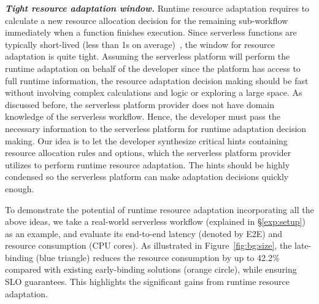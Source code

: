 \textbf{\textit{Tight resource adaptation window.}}
Runtime resource adaptation requires to calculate a new resource allocation decision for the remaining sub-workflow immediately when a function finishes execution. Since serverless functions are typically short-lived (less than 1s on average)~\cite{atc18-peek-bench,socc22-owl,atc20-serverless-in-the-wild,socc23-huawei-cloud}, the window for resource adaptation is quite tight. Assuming the serverless platform will perform the runtime adaptation on behalf of the developer since the platform has access to full runtime information, the resource adaptation decision making should be fast without involving complex calculations and logic or exploring a large space. As discussed before, the serverless platform provider does not have domain knowledge of the serverless workflow. Hence, the developer must pass the necessary information to the serverless platform for runtime adaptation decision making. Our idea is to let the developer synthesize critical hints containing resource allocation rules and options, which the serverless platform provider utilizes to perform runtime resource adaptation. The hints should be highly condensed so the serverless platform can make adaptation decisions quickly enough. 




To demonstrate the potential of runtime resource adaptation incorporating all the above ideas, we take a real-world serverless workflow (explained in \S\ref{exp:setup}) as an example, and evaluate its end-to-end latency (denoted by E2E) and resource consumption (CPU cores).
As illustrated in Figure~\ref{fig:bg:size}, the late-binding (blue triangle) reduces the resource consumption by up to 42.2\% compared with existing early-binding solutions (orange circle), while ensuring SLO guarantees. This highlights the significant gains from runtime resource adaptation. 


